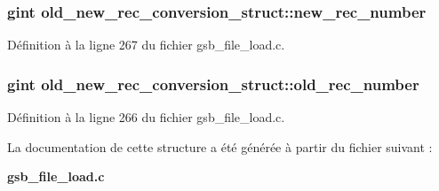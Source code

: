 \subsubsection[{new\_\-rec\_\-number}]{\setlength{\rightskip}{0pt plus 5cm}gint {\bf old\_\-new\_\-rec\_\-conversion\_\-struct::new\_\-rec\_\-number}}\label{structold__new__rec__conversion__struct_a75293f85c11f4e7f2d5b1d9fc68e9852}


Définition à la ligne 267 du fichier gsb\_\-file\_\-load.c.

\subsubsection[{old\_\-rec\_\-number}]{\setlength{\rightskip}{0pt plus 5cm}gint {\bf old\_\-new\_\-rec\_\-conversion\_\-struct::old\_\-rec\_\-number}}\label{structold__new__rec__conversion__struct_a4fd941bd35261143605dd9f6c1994a23}


Définition à la ligne 266 du fichier gsb\_\-file\_\-load.c.



La documentation de cette structure a été générée à partir du fichier suivant :\begin{DoxyCompactItemize}
\item 
{\bf gsb\_\-file\_\-load.c}\end{DoxyCompactItemize}
